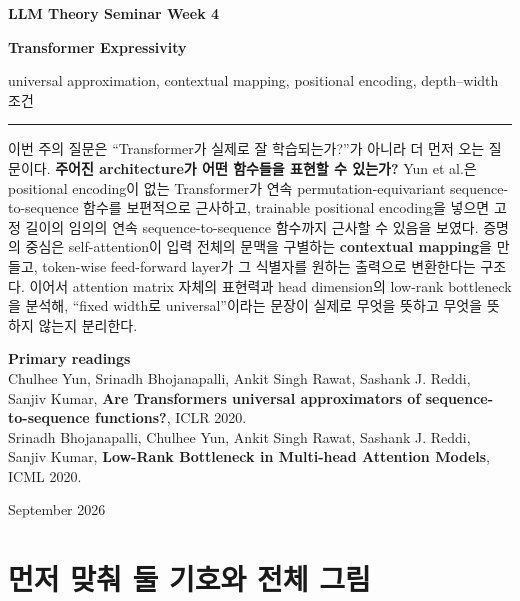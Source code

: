 \documentclass[11pt,a4paper,oneside,openany]{memoir}
\theoremstyle{definition}
\begin{document}
\begin{titlingpage}
\thispagestyle{empty}
\vspace*{1.2cm}
{\small\bfseries LLM Theory Seminar \hfill Week 4\par}
\vspace{1.4cm}
{\HUGE\bfseries Transformer Expressivity\par}
\vspace{0.55cm}
{\large universal approximation, contextual mapping, positional encoding, depth--width 조건\par}
\vspace{0.9cm}
\rule{\textwidth}{0.7pt}
\vspace{1.1cm}

\begin{minipage}{0.86\textwidth}
\small
이번 주의 질문은 ``Transformer가 실제로 잘 학습되는가?''가 아니라 더 먼저 오는 질문이다.
\textbf{주어진 architecture가 어떤 함수들을 표현할 수 있는가?} Yun et al.은 positional encoding이 없는
Transformer가 연속 permutation-equivariant sequence-to-sequence 함수를 보편적으로 근사하고,
trainable positional encoding을 넣으면 고정 길이의 임의의 연속 sequence-to-sequence 함수까지 근사할 수 있음을 보였다.
증명의 중심은 self-attention이 입력 전체의 문맥을 구별하는 \textbf{contextual mapping}을 만들고,
token-wise feed-forward layer가 그 식별자를 원하는 출력으로 변환한다는 구조다. 이어서 attention matrix 자체의
표현력과 head dimension의 low-rank bottleneck을 분석해, ``fixed width로 universal''이라는 문장이 실제로 무엇을 뜻하고
무엇을 뜻하지 않는지 분리한다.
\end{minipage}

\vfill
{\small
\textbf{Primary readings}\\[0.25em]
Chulhee Yun, Srinadh Bhojanapalli, Ankit Singh Rawat, Sashank J. Reddi, Sanjiv Kumar,
\textbf{Are Transformers universal approximators of sequence-to-sequence functions?}, ICLR 2020.\\
Srinadh Bhojanapalli, Chulhee Yun, Ankit Singh Rawat, Sashank J. Reddi, Sanjiv Kumar,
\textbf{Low-Rank Bottleneck in Multi-head Attention Models}, ICML 2020.
\par}
\vspace{0.8cm}
{\small September 2026\par}
\end{titlingpage}

\tableofcontents*
\clearpage

\chapter{먼저 맞춰 둘 기호와 전체 그림}
\end{document}
